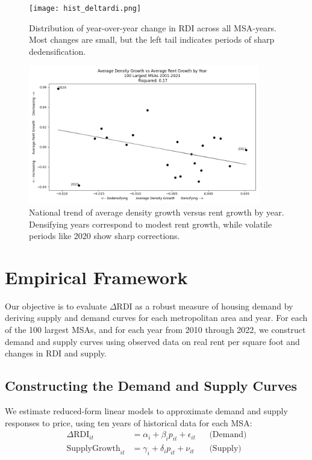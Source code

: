 \documentclass[sn-mathphys-num]{sn-jnl}%
\begin{document}
\begin{figure}[H]
	\centering
	\texttt{[image: hist\_deltardi.png]}
	\caption*{Distribution of year-over-year change in RDI across all MSA-years. Most changes are small, but the left tail indicates periods of sharp dedensification.}
	\label{fig3}
\end{figure}

\begin{figure}[H]
	\centering
	\includegraphics[width=0.9\textwidth]{national_example.png}
	\caption*{National trend of average density growth versus rent growth by year. Densifying years correspond to modest rent growth, while volatile periods like 2020 show sharp corrections.}
	\label{fig6}
\end{figure}

\section*{Empirical Framework}

Our objective is to evaluate \( \Delta \text{RDI} \) as a robust measure of housing demand by deriving supply and demand curves for each metropolitan area and year. For each of the 100 largest MSAs, and for each year from 2010 through 2022, we construct demand and supply curves using observed data on real rent per square foot and changes in RDI and supply.

\subsection*{Constructing the Demand and Supply Curves}

We estimate reduced-form linear models to approximate demand and supply responses to price, using ten years of historical data for each MSA:
\begin{align*}
	\Delta \text{RDI}_{it} &= \alpha_i + \beta_i p_{it} + \epsilon_{it} && \text{(Demand)} \\
	\text{SupplyGrowth}_{it} &= \gamma_i + \delta_i p_{it} + \nu_{it} && \text{(Supply)}
\end{align*}
\end{document}

